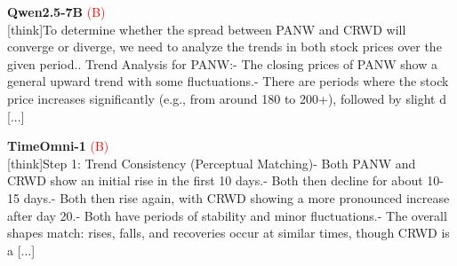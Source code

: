 \noindent
\begin{minipage}[t]{0.28\textwidth}
\colorbox{red!8}{\parbox{\dimexpr\textwidth-2\fboxsep}{
\textbf{Qwen2.5-7B} \textcolor{red}{(B)} \\[2pt]
\tiny
[think]\newline To determine whether the spread between PANW and CRWD will converge or diverge, we need to analyze the trends in both stock prices over the given period.. Trend Analysis for PANW:\newline    - The closing prices of PANW show a general upward trend with some fluctuations.\newline    - There are periods where the stock price increases significantly (e.g., from around 180 to 200+), followed by slight d [...]
}}
\end{minipage}
\hfill
\begin{minipage}[t]{0.28\textwidth}
\colorbox{red!8}{\parbox{\dimexpr\textwidth-2\fboxsep}{
\textbf{TimeOmni-1} \textcolor{red}{(B)} \\[2pt]
\tiny
[think]\newline Step 1: Trend Consistency (Perceptual Matching)\newline - Both PANW and CRWD show an initial rise in the first  10 days.\newline - Both then decline for about 10-15 days.\newline - Both then rise again, with CRWD showing a more pronounced increase after day 20.\newline - Both have periods of stability and minor fluctuations.\newline - The overall shapes match: rises, falls, and recoveries occur at similar times, though CRWD is a [...]
}}
\end{minipage}
\hfill
